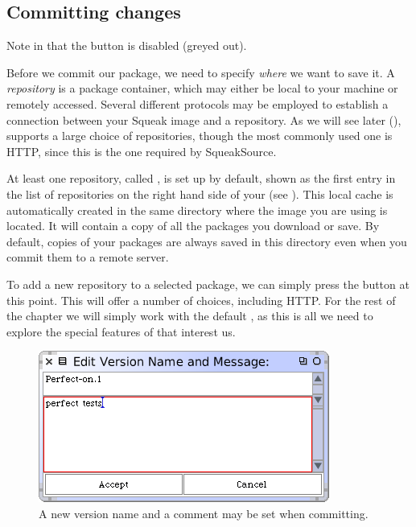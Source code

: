 \documentclass[a4paper,10pt,twoside]{book}
\begin{document}
\subsection{Committing changes}

Note in  that the  button is disabled (greyed out).

Before we commit our  package, we need to specify \emph{where} we want to save it. A \emph{repository} is a package container, which may either be local to your machine or remotely accessed. Several different protocols may be employed to establish a connection between your Squeak image and a repository. As we will see later (), \MC supports a large choice of repositories, though the most commonly used one is HTTP, since this is the one required by SqueakSource.

At least one repository, called , is set up by default, shown as the first entry in the list of repositories on the right hand side of your \MCB (see ).
This local cache is automatically created in the same directory where the image you are using is located. It will contain a copy of all the packages you download or save. 
By default, copies of your packages are always saved in this directory even when you commit them to a remote server.

To add a new repository to a selected package, we can simply press the  button at this point. This will offer a number of choices, including HTTP. For the rest of the chapter we will simply work with the default , as this is all we need to explore the special features of \MC that interest us.


\begin{figure}[ht]\centering
	\includegraphics[width=.55\textwidth]{saving}
	\caption{A new version name and a comment may be set when committing.}
\end{figure}
\end{document}
